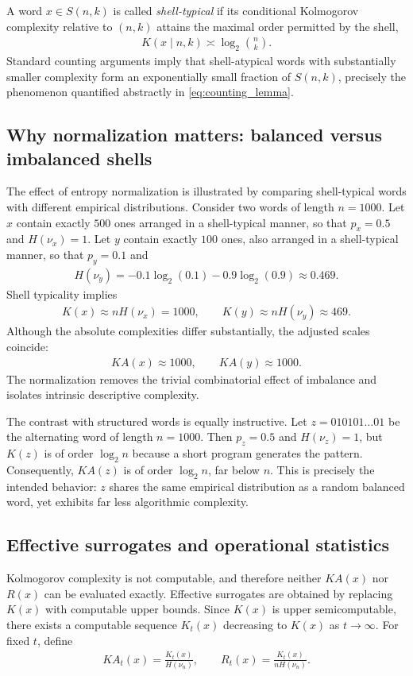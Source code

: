 \documentclass[12pt]{article}
\newcommand{\be}{\begin{eqnarray}}
\newcommand{\ee}{\end{eqnarray}}
\newcommand{\asym}{\asymp}
\begin{document}
A word $x\in S(n,k)$ is called \emph{shell-typical} if its conditional Kolmogorov
complexity relative to $(n,k)$ attains the maximal order permitted by the shell,
\be
K(x\mid n,k) \asym \log_2\binom{n}{k}.
\ee
Standard counting arguments imply that shell-atypical words with substantially
smaller complexity form an exponentially small fraction of $S(n,k)$, precisely
the phenomenon quantified abstractly in \eqref{eq:counting_lemma}.

\subsection*{Why normalization matters: balanced versus imbalanced shells}

The effect of entropy normalization is illustrated by comparing shell-typical
words with different empirical distributions. Consider two words of length
$n=1000$. Let $x$ contain exactly $500$ ones arranged in a shell-typical manner,
so that $p_x=0.5$ and $H(\nu_x)=1$. Let $y$ contain exactly $100$ ones, also
arranged in a shell-typical manner, so that $p_y=0.1$ and
\be
H(\nu_y)
=
-0.1\log_2(0.1)-0.9\log_2(0.9)
\approx0.469.
\ee
Shell typicality implies
\be
K(x)\approx nH(\nu_x)=1000,
\qquad
K(y)\approx nH(\nu_y)\approx469.
\ee
Although the absolute complexities differ substantially, the adjusted scales
coincide:
\be
KA(x)\approx1000,
\qquad
KA(y)\approx1000.
\ee
The normalization removes the trivial combinatorial effect of imbalance and
isolates intrinsic descriptive complexity.

The contrast with structured words is equally instructive. Let
$z=010101\ldots01$ be the alternating word of length $n=1000$. Then
$p_z=0.5$ and $H(\nu_z)=1$, but $K(z)$ is of order $\log_2 n$ because a short
program generates the pattern. Consequently, $KA(z)$ is of order $\log_2 n$,
far below $n$. This is precisely the intended behavior: $z$ shares the same
empirical distribution as a random balanced word, yet exhibits far less
algorithmic complexity.

\subsection*{Effective surrogates and operational statistics}

Kolmogorov complexity is not computable, and therefore neither $KA(x)$ nor
$R(x)$ can be evaluated exactly. Effective surrogates are obtained by replacing
$K(x)$ with computable upper bounds. Since $K(x)$ is upper semicomputable, there
exists a computable sequence $K_t(x)$ decreasing to $K(x)$ as $t\to\infty$. For
fixed $t$, define
\be
KA_t(x)=\frac{K_t(x)}{H(\nu_n)},
\qquad
R_t(x)=\frac{K_t(x)}{nH(\nu_n)}.
\label{eq:Kt_defs_clean}
\ee
\end{document}
